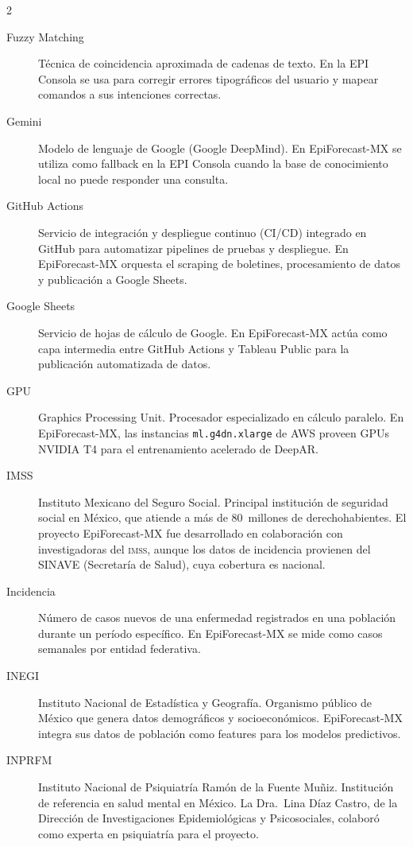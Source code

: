 \documentclass[12pt, letterpaper]{article}
\newcommand{\imss}{\textnormal{\textsc{imss}}}
\begin{document}
\begin{multicols}{2}
\begin{description}
\item[Fuzzy Matching]
Técnica de coincidencia aproximada de cadenas de texto. En la EPI Consola se usa para corregir errores tipográficos del usuario y mapear comandos a sus intenciones correctas.

\item[Gemini]
Modelo de lenguaje de Google (Google DeepMind). En EpiForecast-MX se utiliza como fallback en la EPI Consola cuando la base de conocimiento local no puede responder una consulta.

\item[GitHub Actions]
Servicio de integración y despliegue continuo (CI/CD) integrado en GitHub para automatizar pipelines de pruebas y despliegue. En EpiForecast-MX orquesta el scraping de boletines, procesamiento de datos y publicación a Google Sheets.

\item[Google Sheets]
Servicio de hojas de cálculo de Google. En EpiForecast-MX actúa como capa intermedia entre GitHub Actions y Tableau Public para la publicación automatizada de datos.

\item[GPU]
Graphics Processing Unit. Procesador especializado en cálculo paralelo. En EpiForecast-MX, las instancias \texttt{ml.g4dn.xlarge} de AWS proveen GPUs NVIDIA T4 para el entrenamiento acelerado de DeepAR.

\item[IMSS]
Instituto Mexicano del Seguro Social. Principal institución de seguridad social en México, que atiende a más de 80~millones de derechohabientes. El proyecto EpiForecast-MX fue desarrollado en colaboración con investigadoras del \imss{}, aunque los datos de incidencia provienen del SINAVE (Secretaría de Salud), cuya cobertura es nacional.

\item[Incidencia]
Número de casos nuevos de una enfermedad registrados en una población durante un período específico. En EpiForecast-MX se mide como casos semanales por entidad federativa.

\item[INEGI]
Instituto Nacional de Estadística y Geografía. Organismo público de México que genera datos demográficos y socioeconómicos. EpiForecast-MX integra sus datos de población como features para los modelos predictivos.

\item[INPRFM]
Instituto Nacional de Psiquiatría Ramón de la Fuente Muñiz. Institución de referencia en salud mental en México. La Dra.~Lina Díaz Castro, de la Dirección de Investigaciones Epidemiológicas y Psicosociales, colaboró como experta en psiquiatría para el proyecto.


\end{description}
\end{multicols}
\end{document}
